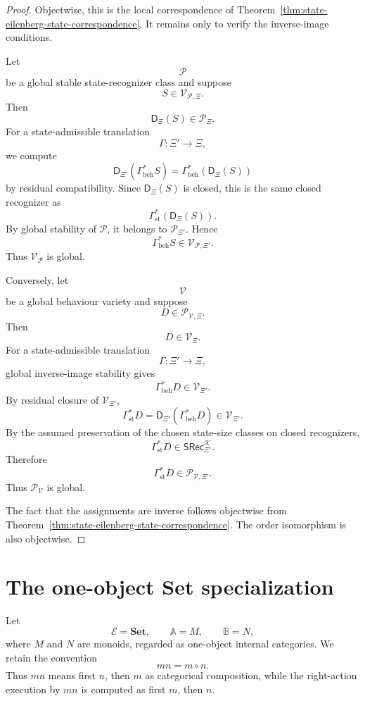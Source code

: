 \begin{proof}
Objectwise, this is the local correspondence of
Theorem~\ref{thm:state-eilenberg-state-correspondence}. It remains only to
verify the inverse-image conditions.

Let
\[
\mathcal P
\]
be a global stable state-recognizer class and suppose
\[
S\in\mathcal V_{\mathcal P,\Xi}.
\]
Then
\[
\mathsf D_\Xi(S)\in\mathcal P_\Xi.
\]
For a state-admissible translation
\[
\Gamma:\Xi'\to\Xi,
\]
we compute
\[
\mathsf D_{\Xi'}(\Gamma_{\mathrm{beh}}^\ast S)
=
\Gamma_{\mathrm{beh}}^\ast(\mathsf D_\Xi(S))
\]
by residual compatibility. Since \(\mathsf D_\Xi(S)\) is closed, this is the
same closed recognizer as
\[
\Gamma_{\mathrm{st}}^\ast(\mathsf D_\Xi(S)).
\]
By global stability of \(\mathcal P\), it belongs to \(\mathcal P_{\Xi'}\).
Hence
\[
\Gamma_{\mathrm{beh}}^\ast S
\in
\mathcal V_{\mathcal P,\Xi'}.
\]
Thus \(\mathcal V_{\mathcal P}\) is global.

Conversely, let
\[
\mathcal V
\]
be a global behaviour variety and suppose
\[
D\in\mathcal P_{\mathcal V,\Xi}.
\]
Then
\[
D\in\mathcal V_\Xi.
\]
For a state-admissible translation
\[
\Gamma:\Xi'\to\Xi,
\]
global inverse-image stability gives
\[
\Gamma_{\mathrm{beh}}^\ast D\in\mathcal V_{\Xi'}.
\]
By residual closure of \(\mathcal V_{\Xi'}\),
\[
\Gamma_{\mathrm{st}}^\ast D
=
\mathsf D_{\Xi'}(\Gamma_{\mathrm{beh}}^\ast D)
\in
\mathcal V_{\Xi'}.
\]
By the assumed preservation of the chosen state-size classes on closed
recognizers,
\[
\Gamma_{\mathrm{st}}^\ast D
\in
\mathsf{SRec}^{\mathcal K}_{\Xi'}.
\]
Therefore
\[
\Gamma_{\mathrm{st}}^\ast D\in\mathcal P_{\mathcal V,\Xi'}.
\]
Thus \(\mathcal P_{\mathcal V}\) is global.

The fact that the assignments are inverse follows objectwise from
Theorem~\ref{thm:state-eilenberg-state-correspondence}. The order
isomorphism is also objectwise.
\end{proof}

\section{The one-object Set specialization}
\label{sec:state-eilenberg-one-object-set}

Let
\[
\mathcal E=\mathbf{Set},
\qquad
\mathbb A=M,
\qquad
\mathbb B=N,
\]
where \(M\) and \(N\) are monoids, regarded as one-object internal
categories. We retain the convention
\[
mn=m\circ n.
\]
Thus \(mn\) means first \(n\), then \(m\) as categorical composition, while
the right-action execution by \(mn\) is computed as first \(m\), then \(n\).

